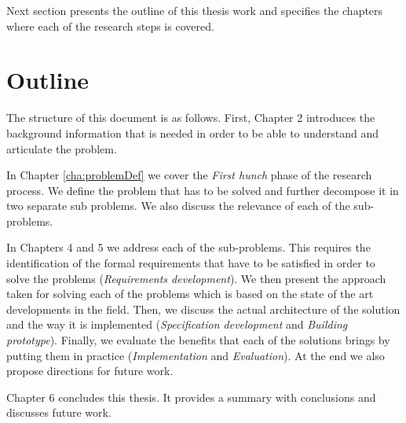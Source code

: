 Next section presents the outline of this thesis work and specifies the chapters where each of the research steps is covered.

\section{Outline}
The structure of this document is as follows. First, Chapter 2 introduces the background information that is needed in order to be able to understand and articulate the problem.

In Chapter \ref{cha:problemDef} we cover the \textit{First hunch} phase of the research process. We define the problem that has to be solved and further decompose it in two separate sub problems. We also discuss the relevance of each of the sub-problems.

In Chapters 4 and 5 we address each of the sub-problems. This requires the identification of the formal requirements that have to be satisfied in order to solve the problems (\textit{Requirements development}). We then present the approach taken for solving each of the problems which is based on the state of the art developments in the field. Then, we discuss the actual architecture of the solution and the way it is implemented (\textit{Specification development} and \textit{Building prototype}). Finally, we evaluate the benefits that each of the solutions brings by putting them in practice (\textit{Implementation} and \textit{Evaluation}). At the end we also propose directions for future work. 

Chapter 6 concludes this thesis. It provides a summary with conclusions and discusses future work.